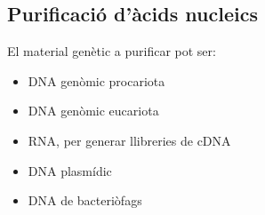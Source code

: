 \subsection{Purificació d'àcids nucleics}
El material genètic a purificar pot ser:
\begin{itemize}
\item DNA genòmic procariota
\item DNA genòmic eucariota
\item RNA, per generar llibreries de cDNA
\item DNA plasmídic
\item DNA de bacteriòfags 
\end{itemize}